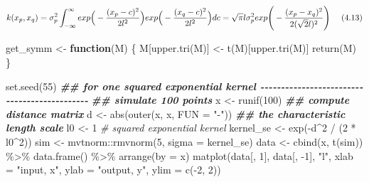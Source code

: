 \documentclass[
]{article}
\newenvironment{Shaded}{\begin{snugshade}}{\end{snugshade}}
\newcommand{\AttributeTok}[1]{\textcolor[rgb]{0.77,0.63,0.00}{#1}}
\newcommand{\CommentTok}[1]{\textcolor[rgb]{0.56,0.35,0.01}{\textit{#1}}}
\newcommand{\ControlFlowTok}[1]{\textcolor[rgb]{0.13,0.29,0.53}{\textbf{#1}}}
\newcommand{\DecValTok}[1]{\textcolor[rgb]{0.00,0.00,0.81}{#1}}
\newcommand{\DocumentationTok}[1]{\textcolor[rgb]{0.56,0.35,0.01}{\textbf{\textit{#1}}}}
\newcommand{\FunctionTok}[1]{\textcolor[rgb]{0.00,0.00,0.00}{#1}}
\newcommand{\NormalTok}[1]{#1}
\newcommand{\OtherTok}[1]{\textcolor[rgb]{0.56,0.35,0.01}{#1}}
\newcommand{\SpecialCharTok}[1]{\textcolor[rgb]{0.00,0.00,0.00}{#1}}
\newcommand{\StringTok}[1]{\textcolor[rgb]{0.31,0.60,0.02}{#1}}
\begin{document}
\[
k(x_p, x_q) = \sigma_p^2 \int_{-\infty}^{\infty} 
exp \Big(- \frac {(x_p - c)^2} {2l^2}\Big)
exp \Big(- \frac {(x_q - c)^2} {2l^2}\Big) dc\\
= \sqrt {\pi} l \sigma_p^2 
exp \Bigg(- \frac {(x_p - x_q)^2} {2(\sqrt 2l)^2} \Bigg)
\ \ \ \ (4.13)
\]

\begin{Shaded}
\begin{Highlighting}[]
\NormalTok{get\_symm }\OtherTok{\textless{}{-}} \ControlFlowTok{function}\NormalTok{(M) \{}
\NormalTok{   M[}\FunctionTok{upper.tri}\NormalTok{(M)] }\OtherTok{\textless{}{-}} \FunctionTok{t}\NormalTok{(M)[}\FunctionTok{upper.tri}\NormalTok{(M)]}
   \FunctionTok{return}\NormalTok{(M)}
\NormalTok{\}}
\end{Highlighting}
\end{Shaded}

\begin{Shaded}
\begin{Highlighting}[]
\FunctionTok{set.seed}\NormalTok{(}\DecValTok{55}\NormalTok{)}
\DocumentationTok{\#\# for one squared exponential kernel {-}{-}{-}{-}{-}{-}{-}{-}{-}{-}{-}{-}{-}{-}{-}{-}{-}{-}{-}{-}{-}{-}{-}{-}{-}{-}{-}{-}{-}{-}{-}{-}{-}{-}{-}{-}{-}{-}{-}{-}{-}{-}{-}{-}{-}}
\DocumentationTok{\#\# simulate 100 points}
\NormalTok{x }\OtherTok{\textless{}{-}} \FunctionTok{runif}\NormalTok{(}\DecValTok{100}\NormalTok{)}
\DocumentationTok{\#\# compute distance matrix}
\NormalTok{d }\OtherTok{\textless{}{-}} \FunctionTok{abs}\NormalTok{(}\FunctionTok{outer}\NormalTok{(x, x, }\AttributeTok{FUN =} \StringTok{"{-}"}\NormalTok{))}
\DocumentationTok{\#\# the characteristic length scale}
\NormalTok{l0 }\OtherTok{\textless{}{-}} \DecValTok{1}
\CommentTok{\# squared exponential kernel}
\NormalTok{kernel\_se }\OtherTok{\textless{}{-}} \FunctionTok{exp}\NormalTok{(}\SpecialCharTok{{-}}\NormalTok{d}\SpecialCharTok{\^{}}\DecValTok{2} \SpecialCharTok{/}\NormalTok{ (}\DecValTok{2} \SpecialCharTok{*}\NormalTok{ l0}\SpecialCharTok{\^{}}\DecValTok{2}\NormalTok{)) }
\NormalTok{sim }\OtherTok{\textless{}{-}}\NormalTok{ mvtnorm}\SpecialCharTok{::}\FunctionTok{rmvnorm}\NormalTok{(}\DecValTok{5}\NormalTok{, }\AttributeTok{sigma =}\NormalTok{ kernel\_se)}
\NormalTok{data }\OtherTok{\textless{}{-}} \FunctionTok{cbind}\NormalTok{(x, }\FunctionTok{t}\NormalTok{(sim)) }\SpecialCharTok{\%\textgreater{}\%} 
    \FunctionTok{data.frame}\NormalTok{() }\SpecialCharTok{\%\textgreater{}\%}
    \FunctionTok{arrange}\NormalTok{(}\AttributeTok{by =}\NormalTok{ x)}
\FunctionTok{matplot}\NormalTok{(data[, }\DecValTok{1}\NormalTok{], data[, }\SpecialCharTok{{-}}\DecValTok{1}\NormalTok{], }\StringTok{"l"}\NormalTok{, }
        \AttributeTok{xlab =} \StringTok{"input, x"}\NormalTok{, }\AttributeTok{ylab =} \StringTok{"output, y"}\NormalTok{, }
        \AttributeTok{ylim =} \FunctionTok{c}\NormalTok{(}\SpecialCharTok{{-}}\DecValTok{2}\NormalTok{, }\DecValTok{2}\NormalTok{))}
\end{Highlighting}
\end{Shaded}
\end{document}
